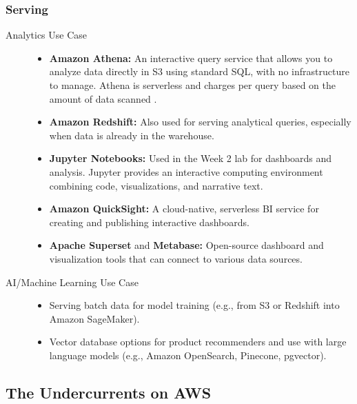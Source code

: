 \documentclass{article}
\begin{document}
\subsubsection{Serving}
\begin{description}
    \item[Analytics Use Case] \hfill
    \begin{itemize}
        \item \textbf{Amazon Athena:} An interactive query service that allows you to analyze data directly in S3 using standard SQL, with no infrastructure to manage. Athena is serverless and charges per query based on the amount of data scanned \cite{aws2023athena}.
        \item \textbf{Amazon Redshift:} Also used for serving analytical queries, especially when data is already in the warehouse.
        \item \textbf{Jupyter Notebooks:} Used in the Week 2 lab for dashboards and analysis. Jupyter provides an interactive computing environment combining code, visualizations, and narrative text.
        \item \textbf{Amazon QuickSight:} A cloud-native, serverless BI service for creating and publishing interactive dashboards.
        \item \textbf{Apache Superset} and \textbf{Metabase:} Open-source dashboard and visualization tools that can connect to various data sources.
    \end{itemize}

    \item[AI/Machine Learning Use Case] \hfill
    \begin{itemize}
        \item Serving batch data for model training (e.g., from S3 or Redshift into Amazon SageMaker).
        \item Vector database options for product recommenders and use with large language models (e.g., Amazon OpenSearch, Pinecone, pgvector).
    \end{itemize}
\end{description}

\subsection{The Undercurrents on AWS}
\end{document}

